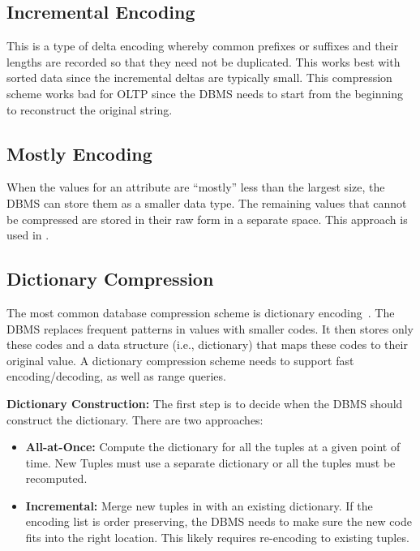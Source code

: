 \documentclass[11pt]{article}
\begin{document}
\subsection*{Incremental Encoding}
This is a type of delta encoding whereby common prefixes or suffixes and their lengths are
recorded so that they need not be duplicated. This works best with sorted data since the incremental
deltas are typically small. This compression scheme works bad for OLTP since the DBMS needs to start
from the beginning to reconstruct the original string.

\subsection*{Mostly Encoding}
When the values for an attribute are ``mostly'' less than the largest size, the DBMS can store
them as a smaller data type. The remaining values that cannot be compressed are stored in their raw
form in a separate space. This approach is used in .

\subsection*{Dictionary Compression}
The most common database compression scheme is dictionary encoding~\cite{p283-binnig}. The DBMS
replaces frequent patterns in values with smaller codes. It then stores only these codes and a data
structure (i.e., dictionary) that maps these codes to their original value. A dictionary compression
scheme needs to support fast encoding/decoding, as well as range queries.

\textbf{Dictionary Construction:} The first step is to decide when the DBMS should construct the dictionary. There are two approaches:
\begin{itemize}
    \item \textbf{All-at-Once:}
    Compute the dictionary for all the tuples at a given point of time.
    New Tuples must use a separate dictionary or all the tuples must be recomputed.

    \item \textbf{Incremental:}
    Merge new tuples in with an existing dictionary. If the encoding list is order
    preserving, the DBMS needs to make sure the new code fits into the right location. This likely
    requires re-encoding to existing tuples.
\end{itemize}
\end{document}
